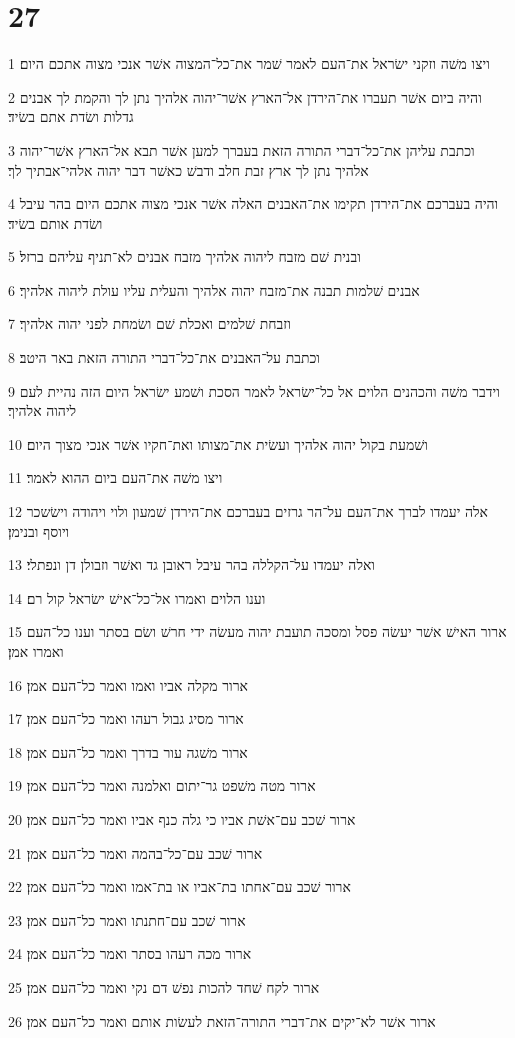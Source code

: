 \chapter{27}

\par 1 ויצו משׁה וזקני ישׂראל את־העם לאמר שׁמר את־כל־המצוה אשׁר אנכי מצוה אתכם היום׃
\par 2 והיה ביום אשׁר תעברו את־הירדן אל־הארץ אשׁר־יהוה אלהיך נתן לך והקמת לך אבנים גדלות ושׂדת אתם בשׂיד׃
\par 3 וכתבת עליהן את־כל־דברי התורה הזאת בעברך למען אשׁר תבא אל־הארץ אשׁר־יהוה אלהיך נתן לך ארץ זבת חלב ודבשׁ כאשׁר דבר יהוה אלהי־אבתיך לך׃
\par 4 והיה בעברכם את־הירדן תקימו את־האבנים האלה אשׁר אנכי מצוה אתכם היום בהר עיבל ושׂדת אותם בשׂיד׃
\par 5 ובנית שׁם מזבח ליהוה אלהיך מזבח אבנים לא־תניף עליהם ברזל׃
\par 6 אבנים שׁלמות תבנה את־מזבח יהוה אלהיך והעלית עליו עולת ליהוה אלהיך׃
\par 7 וזבחת שׁלמים ואכלת שׁם ושׂמחת לפני יהוה אלהיך׃
\par 8 וכתבת על־האבנים את־כל־דברי התורה הזאת באר היטב׃
\par 9 וידבר משׁה והכהנים הלוים אל כל־ישׂראל לאמר הסכת ושׁמע ישׂראל היום הזה נהיית לעם ליהוה אלהיך׃
\par 10 ושׁמעת בקול יהוה אלהיך ועשׂית את־מצותו ואת־חקיו אשׁר אנכי מצוך היום׃
\par 11 ויצו משׁה את־העם ביום ההוא לאמר׃
\par 12 אלה יעמדו לברך את־העם על־הר גרזים בעברכם את־הירדן שׁמעון ולוי ויהודה וישׂשכר ויוסף ובנימן׃
\par 13 ואלה יעמדו על־הקללה בהר עיבל ראובן גד ואשׁר וזבולן דן ונפתלי׃
\par 14 וענו הלוים ואמרו אל־כל־אישׁ ישׂראל קול רם׃
\par 15 ארור האישׁ אשׁר יעשׂה פסל ומסכה תועבת יהוה מעשׂה ידי חרשׁ ושׂם בסתר וענו כל־העם ואמרו אמן׃
\par 16 ארור מקלה אביו ואמו ואמר כל־העם אמן׃
\par 17 ארור מסיג גבול רעהו ואמר כל־העם אמן׃
\par 18 ארור משׁגה עור בדרך ואמר כל־העם אמן׃
\par 19 ארור מטה משׁפט גר־יתום ואלמנה ואמר כל־העם אמן׃
\par 20 ארור שׁכב עם־אשׁת אביו כי גלה כנף אביו ואמר כל־העם אמן׃
\par 21 ארור שׁכב עם־כל־בהמה ואמר כל־העם אמן׃
\par 22 ארור שׁכב עם־אחתו בת־אביו או בת־אמו ואמר כל־העם אמן׃
\par 23 ארור שׁכב עם־חתנתו ואמר כל־העם אמן׃
\par 24 ארור מכה רעהו בסתר ואמר כל־העם אמן׃
\par 25 ארור לקח שׁחד להכות נפשׁ דם נקי ואמר כל־העם אמן׃
\par 26 ארור אשׁר לא־יקים את־דברי התורה־הזאת לעשׂות אותם ואמר כל־העם אמן׃

